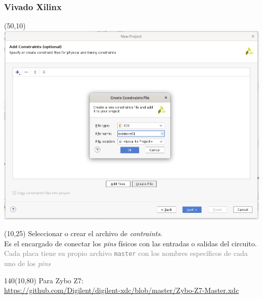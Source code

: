 \documentclass[aspectratio=169]{beamer}
\begin{document}
\begin{frame}[fragile,t]
    \frametitle{Vivado Xilinx}
    \begin{textblock}{75}(50,10) \includegraphics[scale=0.27]{img/vivado/07_add_contraints.png} \end{textblock}
    \begin{textblock}{38}(10,25) \small
    Seleccionar o crear el archivo de \emph{contraints}.\\
    \textcolor{verdeuca}{Es el encargado de conectar los \emph{pins} físicos con las entradas o salidas del circuito.}\\
    \textcolor{gray}{Cada placa tiene su propio archivo \texttt{master} con los nombres específicos de cada uno de los \emph{pins}}
    \end{textblock}
    \begin{textblock}{140}(10,80) \small
    Para Zybo Z7:\\
    \url{https://github.com/Digilent/digilent-xdc/blob/master/Zybo-Z7-Master.xdc}
    \end{textblock}
\end{frame}
    
\end{document}
